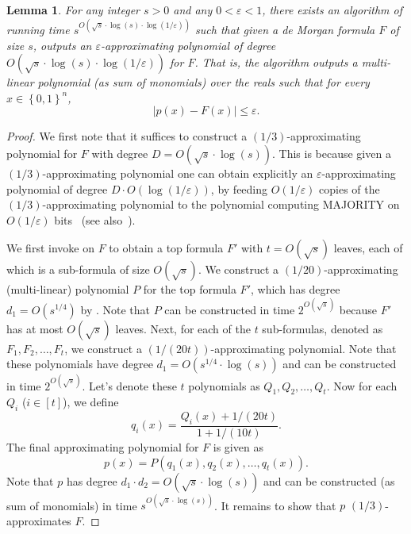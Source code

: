 \documentclass[10pt,a4paper]{article}
\newtheorem{lemma}[theorem]{Lemma}
\newcommand{\bool}{\left\{0,1\right\}}
\begin{document}
    \begin{lemma}\label{thm:sat-explicit-polynomial}
		For any integer $s>0$ and any $0<\varepsilon<1$, there exists an algorithm of running time $s^{O\left(\sqrt{s}\cdot\log(s)\cdot\log(1/\varepsilon)\right)}$ such that given a de Morgan formula $F$ of size $s$, outputs an $\varepsilon$-approximating polynomial of degree $O(\sqrt{s}\cdot\log(s)\cdot\log(1/\varepsilon))$ for $F$. That is, the algorithm outputs a multi-linear polynomial (as sum of monomials) over the reals such that for every $x\in\bool^n$,
		\[
			\left| p(x)-F(x)\right| \leq \varepsilon.
		\]
	\end{lemma}
	
	\begin{proof}
	    We first note that it suffices to construct a $(1/3)$-approximating polynomial for $F$ with degree $D=O(\sqrt{s}\cdot\log(s))$. This is because given a $(1/3)$-approximating polynomial one can obtain explicitly an $\varepsilon$-approximating polynomial of degree $D\cdot O(\log(1/\varepsilon))$, by feeding $O(1/\varepsilon)$ copies of the $(1/3)$-approximating polynomial to the polynomial computing MAJORITY on $O(1/\varepsilon)$ bits~\cite{BNRdW07} (see also~{\cite[Appendix B]{Tal14}}).
	    
	    We first invoke  on $F$ to obtain a top formula $F'$ with $t=O(\sqrt{s})$ leaves, each of which is a sub-formula of size $O(\sqrt{s})$. We construct a $(1/20)$-approximating (multi-linear) polynomial $P$ for the top formula $F'$, which has degree $d_1=O(s^{1/4})$ by . Note that $P$ can be constructed in time $2^{O(\sqrt{s})}$ because $F'$ has at most $O(\sqrt{s})$ leaves. Next, for each of the $t$ sub-formulas, denoted as $F_1,F_2,\dots,F_t$, we construct a $(1/(20t))$-approximating polynomial. Note that these polynomials have degree $d_1=O(s^{1/4}\cdot\log(s))$ and can be constructed in time $2^{O(\sqrt{s})}$. Let's denote these $t$ polynomials as $Q_1, Q_2,\dots,Q_{t}$. Now for each $Q_i$ ($i\in[t]$), we define
	    \[
	        q_i(x)=\frac{Q_i(x)+1/(20t)}{1+1/(10t)}.
	    \]
	    The final approximating polynomial for $F$ is given as
	    \[
	        p(x)=P\left(q_1(x),q_2(x),\dots,q_t(x)\right).
	    \]
	    Note that $p$ has degree $d_1\cdot d_2=O(\sqrt{s}\cdot\log(s))$ and can be constructed (as sum of monomials) in time $s^{O(\sqrt{s}\cdot\log(s))}$. It remains to show that $p$ $(1/3)$-approximates $F$.
	    

\end{proof}
\end{document}
